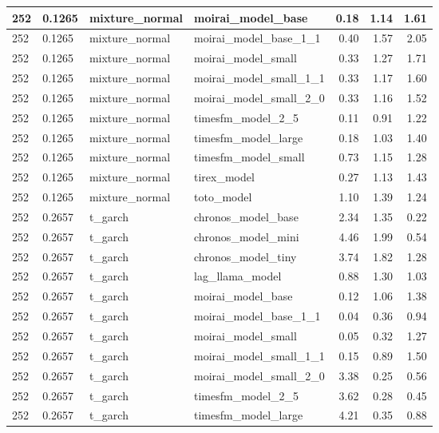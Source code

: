 {\begin{tabular}{llllrrr}
\midrule
252 & 0.1265 & mixture\_normal & moirai\_model\_base & 0.18 & 1.14 & 1.61 \\
\midrule
252 & 0.1265 & mixture\_normal & moirai\_model\_base\_1\_1 & 0.40 & 1.57 & 2.05 \\
\midrule
252 & 0.1265 & mixture\_normal & moirai\_model\_small & 0.33 & 1.27 & 1.71 \\
\midrule
252 & 0.1265 & mixture\_normal & moirai\_model\_small\_1\_1 & 0.33 & 1.17 & 1.60 \\
\midrule
252 & 0.1265 & mixture\_normal & moirai\_model\_small\_2\_0 & 0.33 & 1.16 & 1.52 \\
\midrule
252 & 0.1265 & mixture\_normal & timesfm\_model\_2\_5 & 0.11 & 0.91 & 1.22 \\
\midrule
252 & 0.1265 & mixture\_normal & timesfm\_model\_large & 0.18 & 1.03 & 1.40 \\
\midrule
252 & 0.1265 & mixture\_normal & timesfm\_model\_small & 0.73 & 1.15 & 1.28 \\
\midrule
252 & 0.1265 & mixture\_normal & tirex\_model & 0.27 & 1.13 & 1.43 \\
\midrule
252 & 0.1265 & mixture\_normal & toto\_model & 1.10 & 1.39 & 1.24 \\
\midrule
252 & 0.2657 & t\_garch & chronos\_model\_base & 2.34 & 1.35 & 0.22 \\
\midrule
252 & 0.2657 & t\_garch & chronos\_model\_mini & 4.46 & 1.99 & 0.54 \\
\midrule
252 & 0.2657 & t\_garch & chronos\_model\_tiny & 3.74 & 1.82 & 1.28 \\
\midrule
252 & 0.2657 & t\_garch & lag\_llama\_model & 0.88 & 1.30 & 1.03 \\
\midrule
252 & 0.2657 & t\_garch & moirai\_model\_base & 0.12 & 1.06 & 1.38 \\
\midrule
252 & 0.2657 & t\_garch & moirai\_model\_base\_1\_1 & 0.04 & 0.36 & 0.94 \\
\midrule
252 & 0.2657 & t\_garch & moirai\_model\_small & 0.05 & 0.32 & 1.27 \\
\midrule
252 & 0.2657 & t\_garch & moirai\_model\_small\_1\_1 & 0.15 & 0.89 & 1.50 \\
\midrule
252 & 0.2657 & t\_garch & moirai\_model\_small\_2\_0 & 3.38 & 0.25 & 0.56 \\
\midrule
252 & 0.2657 & t\_garch & timesfm\_model\_2\_5 & 3.62 & 0.28 & 0.45 \\
\midrule
252 & 0.2657 & t\_garch & timesfm\_model\_large & 4.21 & 0.35 & 0.88 \\

\end{tabular}}
